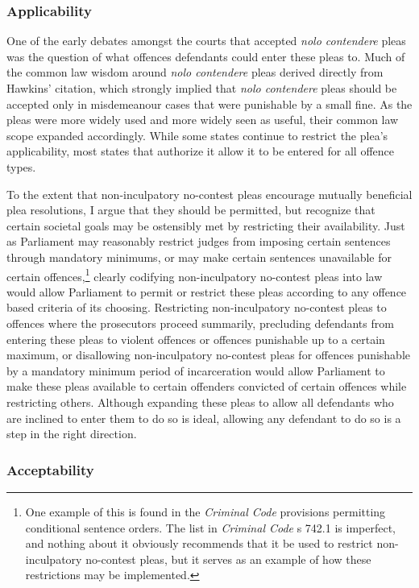 \subsubsection{Applicability}

One of the early debates amongst the courts that accepted \textit{nolo contendere} pleas was the question of what offences defendants could enter these pleas to. Much of the common law wisdom around \textit{nolo contendere} pleas derived directly from Hawkins' citation, which strongly implied that \textit{nolo contendere} pleas should be accepted only in misdemeanour cases that were punishable by a small fine. As the pleas were more widely used and more widely seen as useful, their common law scope expanded accordingly. While some states continue to restrict the plea's applicability, most states that authorize it allow it to be entered for all offence types.

To the extent that non-inculpatory no-contest pleas encourage mutually beneficial plea resolutions, I argue that they should be permitted, but recognize that certain societal goals may be ostensibly met by restricting their availability. Just as Parliament may reasonably restrict judges from imposing certain sentences through mandatory minimums, or may make certain sentences unavailable for certain offences,\footnote{One example of this is found in the \textit{Criminal Code} provisions permitting conditional sentence orders. The list in \textit{Criminal Code} s 742.1 is imperfect, and nothing about it obviously recommends that it be used to restrict non-inculpatory no-contest pleas, but it serves as an example of how these restrictions may be implemented.} clearly codifying non-inculpatory no-contest pleas into law would allow Parliament to permit or restrict these pleas according to any offence based criteria of its choosing. Restricting non-inculpatory no-contest pleas to offences where the prosecutors proceed summarily, precluding defendants from entering these pleas to violent offences or offences punishable up to a certain maximum, or disallowing non-inculpatory no-contest pleas for offences punishable by a mandatory minimum period of incarceration would allow Parliament to make these pleas available to certain offenders convicted of certain offences while restricting others. Although expanding these pleas to allow all defendants who are inclined to enter them to do so is ideal, allowing any defendant to do so is a step in the right direction.

\subsubsection{Acceptability}

